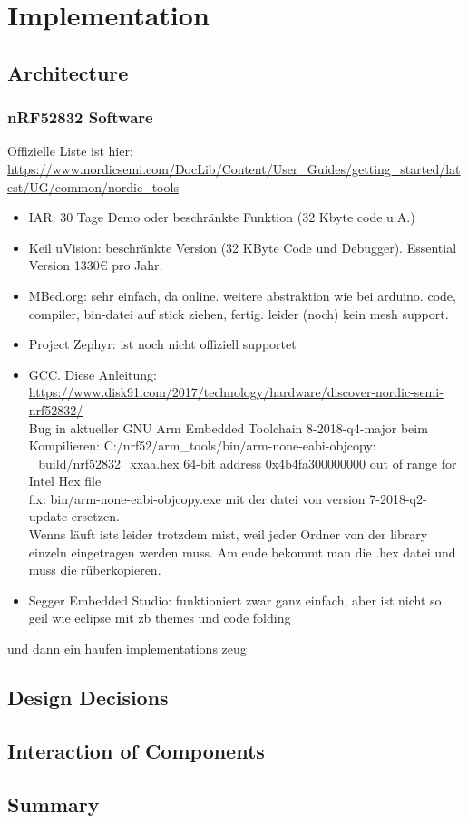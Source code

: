\chapter{Implementation}
\label{ch:implementation}

\section{Architecture}

\subsection{nRF52832 Software}
Offizielle Liste ist hier:
\url{https://www.nordicsemi.com/DocLib/Content/User_Guides/getting_started/latest/UG/common/nordic_tools}
\begin{itemize}
\item IAR: 30 Tage Demo oder beschränkte Funktion (32 Kbyte code u.A.)
\item Keil uVision: beschränkte Version (32 KByte Code und Debugger). Essential Version 1330€ pro Jahr.
\item MBed.org: sehr einfach, da online. weitere abstraktion wie bei arduino. code, compiler, bin-datei auf stick ziehen, fertig. leider (noch) kein mesh support.
\item Project Zephyr: ist noch nicht offiziell supportet
\item GCC. Diese Anleitung: \url{https://www.disk91.com/2017/technology/hardware/discover-nordic-semi-nrf52832/}\\
Bug in aktueller GNU Arm Embedded Toolchain 8-2018-q4-major beim Kompilieren: C:/nrf52/arm\_tools/bin/arm-none-eabi-objcopy: \_build/nrf52832\_xxaa.hex 64-bit address 0x4b4fa300000000 out of range for Intel Hex file\\
fix: bin/arm-none-eabi-objcopy.exe mit der datei von version 7-2018-q2-update ersetzen.\\
Wenns läuft ists leider trotzdem mist, weil jeder Ordner von der library einzeln eingetragen werden muss. Am ende bekommt man die .hex datei und muss die rüberkopieren.
\item Segger Embedded Studio: funktioniert zwar ganz einfach, aber ist nicht so geil wie eclipse mit zb themes und code folding
\end{itemize}
und dann ein haufen implementations zeug

\section{Design Decisions}

\section{Interaction of Components}

\section{Summary}